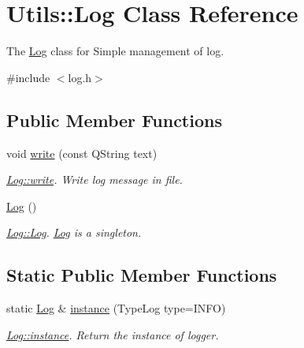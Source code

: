\hypertarget{classUtils_1_1Log}{\section{Utils\-:\-:Log Class Reference}
\label{classUtils_1_1Log}
}


The \hyperlink{classUtils_1_1Log}{Log} class for Simple management of log.  




{\ttfamily \#include $<$log.\-h$>$}

\subsection*{Public Member Functions}
\begin{DoxyCompactItemize}
\item 
void \hyperlink{classUtils_1_1Log_a9f21042e13648171da95b27830e91c75}{write} (const Q\-String text)
\begin{DoxyCompactList}\small\item\em \hyperlink{classUtils_1_1Log_a9f21042e13648171da95b27830e91c75}{Log\-::write}. Write log message in file. \end{DoxyCompactList}\item 
\hypertarget{classUtils_1_1Log_a0191645e4f86af331290c7062c79d7b7}{\hyperlink{classUtils_1_1Log_a0191645e4f86af331290c7062c79d7b7}{Log} ()}\label{classUtils_1_1Log_a0191645e4f86af331290c7062c79d7b7}

\begin{DoxyCompactList}\small\item\em \hyperlink{classUtils_1_1Log_a0191645e4f86af331290c7062c79d7b7}{Log\-::\-Log}. \hyperlink{classUtils_1_1Log}{Log} is a singleton. \end{DoxyCompactList}\end{DoxyCompactItemize}
\subsection*{Static Public Member Functions}
\begin{DoxyCompactItemize}
\item 
static \hyperlink{classUtils_1_1Log}{Log} \& \hyperlink{classUtils_1_1Log_aea616362bc63f99499e3964d5dc759d2}{instance} (Type\-Log type=I\-N\-F\-O)
\begin{DoxyCompactList}\small\item\em \hyperlink{classUtils_1_1Log_aea616362bc63f99499e3964d5dc759d2}{Log\-::instance}. Return the instance of logger. \end{DoxyCompactList}\end{DoxyCompactItemize}
